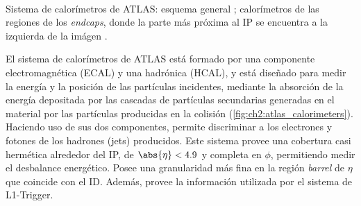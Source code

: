 \begin{marginfigure}
    \\
    \caption{Sistema de calorímetros de ATLAS: esquema general ; calorímetros de las regiones de los \textit{endcaps}, donde la parte más próxima al IP se encuentra a la izquierda de la imágen .}
    \label{fig:ch2:atlas_calorimeters}
\end{marginfigure}

El sistema de calorímetros de ATLAS está formado por una componente electromagnética (ECAL) y una hadrónica (HCAL), y está diseñado para medir la energía y la posición de las partículas incidentes, mediante la absorción de la energía depositada por las cascadas de partículas secundarias generadas en el material por las partículas producidas en la colisión (\cref{fig:ch2:atlas_calorimeters}). Haciendo uso de sus dos componentes, permite discriminar a los electrones y fotones de los hadrones (jets) producidos. Este sistema provee una cobertura casi hermética alrededor del IP, de $\abs{\eta} < 4.9$ y completa en $\phi$, permitiendo medir el desbalance energético. Posee una granularidad más fina en la región  \textit{barrel} de $\eta$ que coincide con el ID. Además, provee la información utilizada por el sistema de L1-Trigger.


